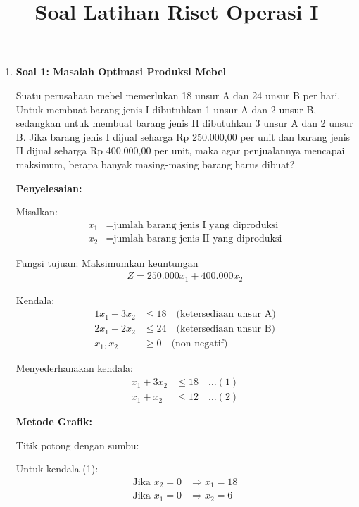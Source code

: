 \documentclass[12pt,a4paper]{article}
\title{Soal Latihan Riset Operasi I}
\author{}
\date{}
\begin{document}
\maketitle

\begin{enumerate}
    \item \textbf{Soal 1: Masalah Optimasi Produksi Mebel}
    
    Suatu perusahaan mebel memerlukan 18 unsur A dan 24 unsur B per hari. Untuk membuat barang jenis I dibutuhkan 1 unsur A dan 2 unsur B, sedangkan untuk membuat barang jenis II dibutuhkan 3 unsur A dan 2 unsur B. Jika barang jenis I dijual seharga Rp 250.000,00 per unit dan barang jenis II dijual seharga Rp 400.000,00 per unit, maka agar penjualannya mencapai maksimum, berapa banyak masing-masing barang harus dibuat?
    
    \textbf{Penyelesaian:}
    
    Misalkan:
    \begin{align*}
    x_1 &= \text{jumlah barang jenis I yang diproduksi}\\  
    x_2 &= \text{jumlah barang jenis II yang diproduksi}
    \end{align*}
    
    Fungsi tujuan: Maksimumkan keuntungan
    \begin{align*}
    Z = 250.000x_1 + 400.000x_2
    \end{align*}
    
    Kendala:
    \begin{align*}
    1x_1 + 3x_2 &\leq 18 \quad \text{(ketersediaan unsur A)}\\  
    2x_1 + 2x_2 &\leq 24 \quad \text{(ketersediaan unsur B)}\\  
    x_1, x_2 &\geq 0 \quad \text{(non-negatif)}
    \end{align*}
    
    Menyederhanakan kendala:
    \begin{align*}
    x_1 + 3x_2 &\leq 18 \quad \ldots (1)\\  
    x_1 + x_2 &\leq 12 \quad \ldots (2)
    \end{align*}
    
    \textbf{Metode Grafik:}
    
    Titik potong dengan sumbu:
    
    Untuk kendala (1):
    \begin{align*}
    \text{Jika } x_2 = 0 &\Rightarrow x_1 = 18\\  
    \text{Jika } x_1 = 0 &\Rightarrow x_2 = 6
    \end{align*}
    

\end{enumerate}
\end{document}
